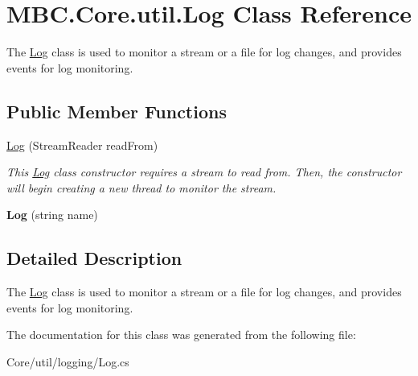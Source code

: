 \hypertarget{class_m_b_c_1_1_core_1_1util_1_1_log}{\section{M\-B\-C.\-Core.\-util.\-Log Class Reference}
\label{class_m_b_c_1_1_core_1_1util_1_1_log}
}


The \hyperlink{class_m_b_c_1_1_core_1_1util_1_1_log}{Log} class is used to monitor a stream or a file for log changes, and provides events for log monitoring. 


\subsection*{Public Member Functions}
\begin{DoxyCompactItemize}
\item 
\hypertarget{class_m_b_c_1_1_core_1_1util_1_1_log_a2cd8fbd24c6339b8d9c4855476dc29a1}{\hyperlink{class_m_b_c_1_1_core_1_1util_1_1_log_a2cd8fbd24c6339b8d9c4855476dc29a1}{Log} (Stream\-Reader read\-From)}\label{class_m_b_c_1_1_core_1_1util_1_1_log_a2cd8fbd24c6339b8d9c4855476dc29a1}

\begin{DoxyCompactList}\small\item\em This \hyperlink{class_m_b_c_1_1_core_1_1util_1_1_log}{Log} class constructor requires a stream to read from. Then, the constructor will begin creating a new thread to monitor the stream.\end{DoxyCompactList}\item 
\hypertarget{class_m_b_c_1_1_core_1_1util_1_1_log_adea40d75bea8396044ab77b8f950d81d}{{\bfseries Log} (string name)}\label{class_m_b_c_1_1_core_1_1util_1_1_log_adea40d75bea8396044ab77b8f950d81d}

\end{DoxyCompactItemize}


\subsection{Detailed Description}
The \hyperlink{class_m_b_c_1_1_core_1_1util_1_1_log}{Log} class is used to monitor a stream or a file for log changes, and provides events for log monitoring.

The documentation for this class was generated from the following file\-:\begin{DoxyCompactItemize}
\item 
Core/util/logging/Log.\-cs\end{DoxyCompactItemize}
